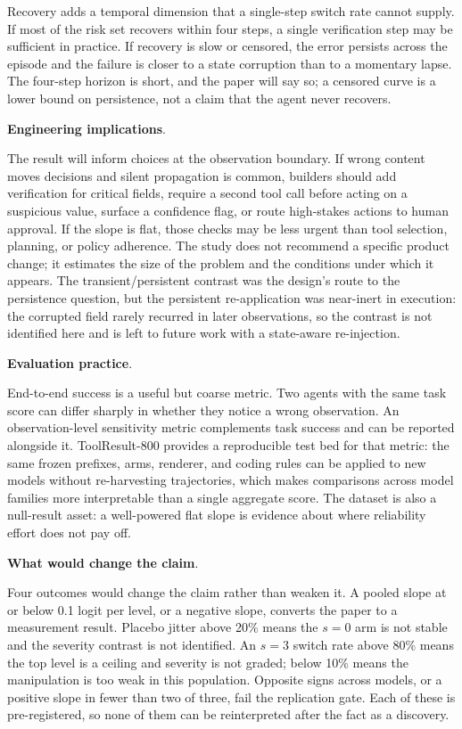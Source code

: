 \documentclass[a4paper,fleqn]{cas-sc}
\begin{document}
Recovery adds a temporal dimension that a single-step switch rate cannot supply. If most of the
risk set recovers within four steps, a single verification step may be sufficient in practice. If
recovery is slow or censored, the error persists across the episode and the failure is closer to
a state corruption than to a momentary lapse. The four-step horizon is short, and the paper will
say so; a censored curve is a lower bound on persistence, not a claim that the agent never
recovers.

\noindent\textbf{Engineering implications}.\

The result will inform choices at the observation boundary. If wrong content moves decisions and
silent propagation is common, builders should add verification for critical fields, require a
second tool call before acting on a suspicious value, surface a confidence flag, or route
high-stakes actions to human approval. If the slope is flat, those checks may be less urgent than
tool selection, planning, or policy adherence. The study does not recommend a specific product
change; it estimates the size of the problem and the conditions under which it appears. The
transient/persistent contrast was the design's route to the persistence question, but the
persistent re-application was near-inert in execution: the corrupted field rarely recurred in
later observations, so the contrast is not identified here and is left to future work with a
state-aware re-injection.

\noindent\textbf{Evaluation practice}.\

End-to-end success is a useful but coarse metric. Two agents with the same task score can differ
sharply in whether they notice a wrong observation. An observation-level sensitivity metric
complements task success and can be reported alongside it. ToolResult-800 provides a reproducible
test bed for that metric: the same frozen prefixes, arms, renderer, and coding rules can be
applied to new models without re-harvesting trajectories, which makes comparisons across model
families more interpretable than a single aggregate score. The dataset is also a null-result
asset: a well-powered flat slope is evidence about where reliability effort does not pay off.

\noindent\textbf{What would change the claim}.\

Four outcomes would change the claim rather than weaken it. A pooled slope at or below 0.1 logit
per level, or a negative slope, converts the paper to a measurement result. Placebo jitter above
20\% means the $s=0$ arm is not stable and the severity contrast is not identified. An $s=3$
switch rate above 80\% means the top level is a ceiling and severity is not graded; below 10\%
means the manipulation is too weak in this population. Opposite signs across models, or a
positive slope in fewer than two of three, fail the replication gate. Each of these is
pre-registered, so none of them can be reinterpreted after the fact as a discovery.
\end{document}
